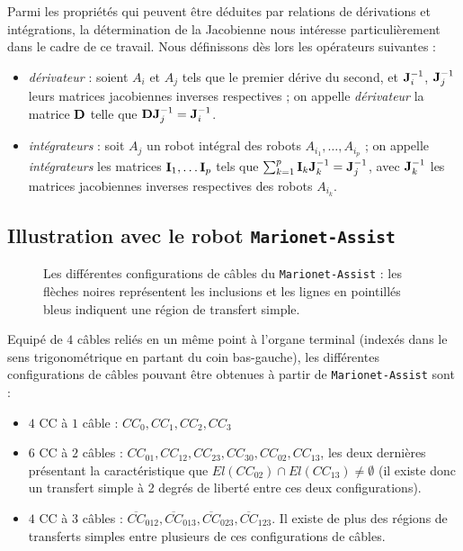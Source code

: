 Parmi les propri\'et\'es qui peuvent \^etre d\'eduites par relations de 
d\'erivations et int\'egrations, la d\'etermination de la Jacobienne nous 
int\'eresse particuli\`erement dans le cadre de ce travail. Nous d\'efinissons 
d\`es lors les op\'erateurs suivantes :

\begin{itemize}
 \item {\it d\'erivateur} : soient $A_i$ et $A_j$ tels que le premier d\'erive 
du second, et ${\bf J}^{-1}_i$, ${\bf J}^{-1}_j$ leurs matrices jacobiennes 
inverses respectives ; on appelle {\it d\'erivateur} la matrice ${\bf D}$ telle 
que $ {\bf D} {\bf J}^{-1}_j = {\bf J}^{-1}_i$.
 \item {\it int\'egrateurs} : soit $A_j$ un robot int\'egral des robots 
$A_{i_1}, \dots, A_{i_p}$ ; on appelle {\it int\'egrateurs} les matrices 
${\bf I}_1, \dots {\bf I}_p$ tels que $\sum_{k=1}^p {\bf I}_k {\bf J}^{-1}_k = 
{\bf J}^{-1}_j$, avec ${\bf J}^{-1}_k$ les matrices jacobiennes inverses 
respectives des robots $A_{i_k}$.
\end{itemize}


\subsection{Illustration avec le robot {\tt Marionet-Assist}}

\begin{figure}[!ht]
  \centering
    \def\svgwidth{.65\linewidth}
  
    \caption{\footnotesize{Les diff\'erentes configurations de c\^ables du 
{\tt Marionet-Assist} : les fl\`eches noires repr\'esentent les inclusions et 
les lignes en pointill\'es bleus indiquent une r\'egion de transfert simple.}}
\label{chap01:fig0}
\end{figure}

Equip\'e de $4$ c\^ables reli\'es en un m\^eme point \`a l'organe 
terminal (index\'es dans le sens trigonom\'etrique en partant du coin 
bas-gauche), les diff\'erentes confi\-gurations de c\^ables pouvant \^etre 
obtenues \`a partir de {\tt Marionet-Assist} sont :
\begin{itemize}
 \item $4$ CC \`a $1$ c\^able : $CC_0, CC_1, CC_2, CC_3$
  \item $6$ CC \`a $2$ c\^ables : $CC_{01}, CC_{12}, CC_{23}, CC_{30}, 
CC_{02}, 
CC_{13}$, les deux derni\`eres pr\'esentant la caract\'eristique que 
$El(CC_{02}) \cap El(CC_{13}) \neq \emptyset$ (il existe donc un transfert 
simple \`a 2 degr\'es de libert\'e entre ces deux configurations).
  \item $4$ CC \`a $3$ c\^ables : $\overline{CC}_{012}, \overline{CC}_{013}, 
\overline{CC}_{023}, \overline{CC}_{123}$. Il existe de plus des r\'egions de 
transferts simples entre plusieurs de ces configurations de c\^ables.
\end{itemize}

